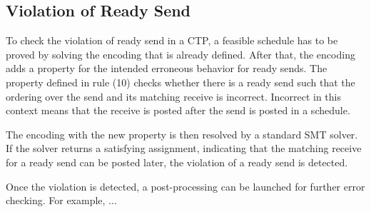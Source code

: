 

\subsection{Violation of Ready Send}

To check the violation of ready send in a CTP, a feasible schedule has to be proved by solving the encoding that is already defined. After that, the encoding adds a property for the intended erroneous behavior for ready sends. The property defined in rule (10) checks whether there is a ready send such that the ordering over the send and its matching receive is incorrect. Incorrect in this context means that the receive is posted after the send is posted in a schedule.

\encodingready

The encoding with the new property is then resolved by a standard SMT solver. If the solver returns a satisfying assignment, indicating that the matching receive for a ready send can be posted later, the violation of a ready send is detected.

Once the violation is detected, a post-processing can be launched for further error checking. For example, ... 






